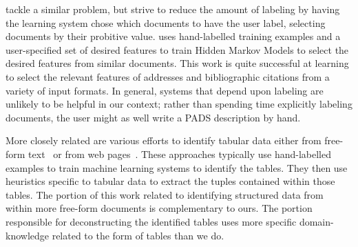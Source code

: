 \citet{muslea+:active-learning} tackle a similar
problem, but strive to reduce the amount of labeling by having the
learning system chose which documents to have the user label,
selecting documents by their probitive value.  \citet{borkar+:text-segmentation} uses hand-labelled training
examples and a user-specified set of desired features to train Hidden
Markov Models to select the desired features from similar documents.
This work is quite successful at learning to select the relevant
features of addresses and bibliographic citations from a variety of
input formats. 
In general, systems that depend
upon labeling are unlikely to be helpful in our context; rather than
spending time explicitly labeling documents, the user might as well
write a PADS description by hand.


More closely related are various efforts to identify tabular data 
either from free-form text~\cite{Ng+:texttables,Pinto+:texttables} or
from web pages~\cite{Lerman+:webtables}.  These approaches typically
use hand-labelled examples to train machine learning systems to
identify the tables.  They then use heuristics specific to tabular
data to extract the tuples contained within those tables.  The portion
of this work related to identifying structured data from within more
free-form documents is complementary to ours.  The portion responsible
for deconstructing the identified tables uses more specific
domain-knowledge related to the form of tables than we do.

